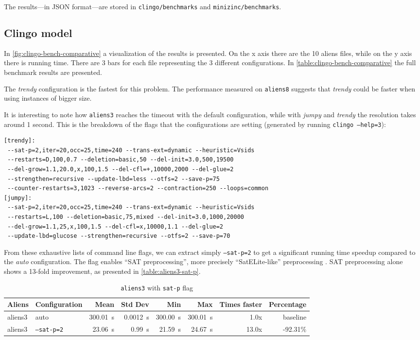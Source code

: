 \documentclass[11pt]{article}
\begin{document}
The results---in JSON format---are stored in \texttt{clingo/benchmarks} and \texttt{minizinc/benchmarks}.

\subsection{Clingo model}

In \autoref{fig:clingo-bench-comparative} a visualization of the results is presented.
On the x axis there are the 10 aliens files, while on the y axis there is running time.
There are 3 bars for each file representing the 3 different configurations.
In \autoref{table:clingo-bench-comparative} the full benchmark results are presented.

The \textit{trendy} configuration is the fastest for this problem.
The performance measured on \texttt{aliens8} suggests that \textit{trendy} could be faster when using instances of bigger size.

It is interesting to note how \texttt{aliens3} reaches the timeout with the default configuration, while with \textit{jumpy} and \textit{trendy} the resolution takes around 1 second.
This is the breakdown of the flags that the configurations are setting (generated by running \texttt{clingo --help=3}):

\begin{verbatim}
[trendy]:
 --sat-p=2,iter=20,occ=25,time=240 --trans-ext=dynamic --heuristic=Vsids
 --restarts=D,100,0.7 --deletion=basic,50 --del-init=3.0,500,19500
 --del-grow=1.1,20.0,x,100,1.5 --del-cfl=+,10000,2000 --del-glue=2
 --strengthen=recursive --update-lbd=less --otfs=2 --save-p=75
 --counter-restarts=3,1023 --reverse-arcs=2 --contraction=250 --loops=common
[jumpy]:
 --sat-p=2,iter=20,occ=25,time=240 --trans-ext=dynamic --heuristic=Vsids
 --restarts=L,100 --deletion=basic,75,mixed --del-init=3.0,1000,20000
 --del-grow=1.1,25,x,100,1.5 --del-cfl=x,10000,1.1 --del-glue=2
 --update-lbd=glucose --strengthen=recursive --otfs=2 --save-p=70
\end{verbatim}

From these exhaustive lists of command line flags, we can extract simply \texttt{--sat-p=2} to get a significant running time speedup compared to the \textit{auto} configuration.
The flag enables ``SAT preprocessing'', more precisely ``SatELite-like'' preprocessing \cite{clingo-guide}.
SAT preprocessing alone shows a 13-fold improvement, as presented in \autoref{table:aliens3-sat-p}.

\begin{table}[h]
  \centering
  \begin{tabular}{|llrrrrrr|}
    \hline
    Aliens & Configuration & Mean & Std Dev & Min & Max & Times faster & Percentage \\
    \hline
    aliens3 & auto & 300.01~s & 0.0012~s & 300.00~s & 300.01~s & 1.0x & baseline \\
    aliens3 & \texttt{--sat-p=2} & 23.06~s & 0.99~s & 21.59~s & 24.67~s & 13.0x & -92.31\% \\
    \hline
  \end{tabular}
  \caption{\texttt{aliens3} with \texttt{sat-p} flag}
  \label{table:aliens3-sat-p}
\end{table}
\end{document}
